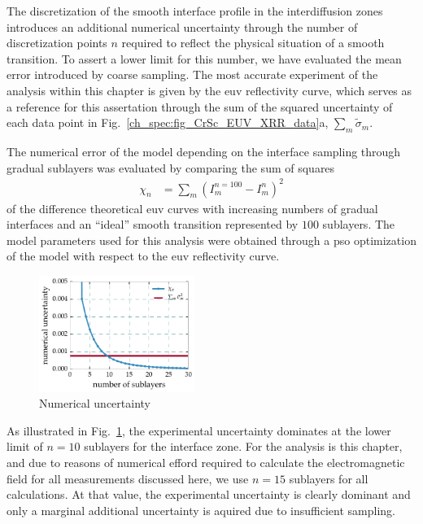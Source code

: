 The discretization of the smooth interface profile in the interdiffusion zones introduces an additional numerical uncertainty through the number of discretization points $n$ required to reflect the physical situation of a smooth transition. To assert a lower limit for this number, we have evaluated the mean error introduced by coarse sampling. The most accurate experiment of the analysis within this chapter is given by the \gls{euv} reflectivity curve, which serves as a reference for this assertation through the sum of the squared uncertainty of each data point in Fig.~\ref{ch_spec:fig_CrSc_EUV_XRR_data}a, $\sum_m \tilde{\sigma}_m$. 

The numerical error of the model depending on the interface sampling through gradual sublayers was evaluated by comparing the sum of squares
\begin{align}
\chi_n &= \sum\limits_m (I^{n=100}_m - I^n_m)^2
\end{align}
of the difference theoretical \gls{euv} curves with increasing numbers of gradual interfaces and an ``ideal'' smooth transition represented by $100$ sublayers. The model parameters used for this analysis were obtained through a \gls{pso} optimization of the model with respect to the \gls{euv} reflectivity curve.
\begin{figure}[htbp]
  \centering
  \includegraphics[width=0.45\textwidth]{img/CrSc_numerical_uncertainty_mixlayer}
  \caption{Numerical uncertainty}
  \label{ch_spec:fig_CrSc_numerical_uncertainty_mixlayer}
\end{figure}
As illustrated in Fig.~\ref{ch_spec:fig_CrSc_numerical_uncertainty_mixlayer}, the experimental uncertainty dominates at the lower limit of $n=10$ sublayers for the interface zone.
For the analysis is this chapter, and due to reasons of numerical efford required to calculate the electromagnetic field for all measurements discussed here, we use $n=15$ sublayers for all calculations. At that value, the experimental uncertainty is clearly dominant and only a marginal additional uncertainty is aquired due to insufficient sampling.

